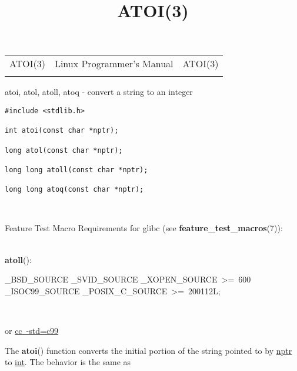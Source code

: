 \documentclass[]{article}
\title{ATOI(3)}
\author{}
\date{}
\let\realtextbf=\textbf
\renewcommand{\textbf}[1]{\textcolor{boldcolor}{\realtextbf{#1}}}
\renewcommand{\emph}[1]{\underline{#1}}
\begin{document}
\maketitle

\begin{longtable}[c]{@{}lll@{}}
\toprule\addlinespace
ATOI(3) & Linux Programmer's Manual & ATOI(3)
\\\addlinespace
\bottomrule
\end{longtable}


atoi, atol, atoll, atoq - convert a string to an integer


\begin{verbatim}
#include <stdlib.h>
 
int atoi(const char *nptr);
 
long atol(const char *nptr);
 
long long atoll(const char *nptr);
 
long long atoq(const char *nptr);
\end{verbatim}

~

Feature Test Macro Requirements for glibc (see
\textbf{feature\_test\_macros}(7)): \\

~

\textbf{atoll}():

\_BSD\_SOURCE \textbar{}\textbar{} \_SVID\_SOURCE \textbar{}\textbar{}
\_XOPEN\_SOURCE~\textgreater{}=~600 \textbar{}\textbar{}
\_ISOC99\_SOURCE \textbar{}\textbar{}
\_POSIX\_C\_SOURCE~\textgreater{}=~200112L;

~

or \emph{cc~-std=c99}


The \textbf{atoi}() function converts the initial portion of the string
pointed to by \emph{nptr} to \emph{int}. The behavior is the same as
\end{document}
